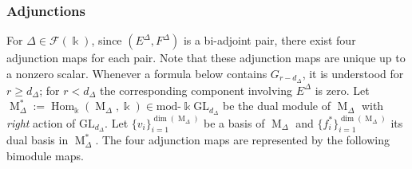\documentclass[12pt]{amsart}
\numberwithin{itemcounter}{subsection}
\theoremstyle{plain}
\theoremstyle{definition}
\theoremstyle{remark}
\numberwithin{equation}{section}
\def\k{\Bbbk}
\def\calF{\mathcal{F}}
\def\GL{\mathrm{GL}}
\def\M{{\operatorname{M}\nolimits}}
\def\Hom{\operatorname{Hom}\nolimits}
\def\Hom{\operatorname{Hom}}
\begin{document}
\subsubsection{Adjunctions}
\label{sec:adj}
For $\Delta\in \calF(\k)$, since $(E^{\Delta}, F^{\Delta})$ is a bi-adjoint pair, there exist four adjunction maps for each pair. Note that these adjunction maps are unique up to a nonzero scalar.
Whenever a formula below contains $G_{r-d_\Delta}$, it is understood for $r\ge d_\Delta$; for $r<d_\Delta$ the corresponding component involving $E^\Delta$ is zero.
Let $\M^*_\Delta:=\Hom_\k(\M_\Delta,\k)\in \text{mod-}\k\GL_{d_\Delta}$ be the dual module of $\M_\Delta$ with \emph{right} action of $\GL_{d_\Delta}.$
Let $\{v_i\}^{\dim(\M_\Delta)}_{i=1}$ be a basis of $\M_\Delta$ and
$\{f^*_i\}^{\dim(\M_\Delta)}_{i=1}$ its dual basis in $\M^*_\Delta$.
The four adjunction maps are represented by the following bimodule maps.
\end{document}
